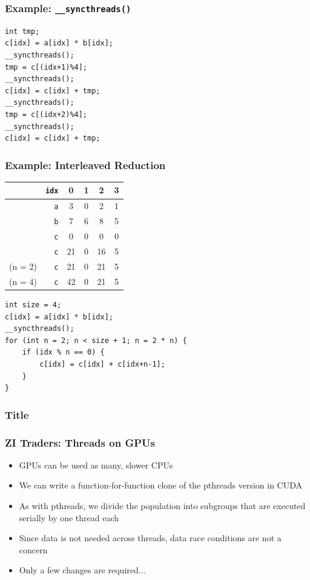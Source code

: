 \documentclass[handout]{beamer}
\begin{document}
\begin{frame}[fragile]
  \frametitle{Example: \texttt{\_\_syncthreads()}}
\begin{lstlisting}
int tmp;
c[idx] = a[idx] * b[idx];
__syncthreads();
tmp = c[(idx+1)%4];
__syncthreads();
c[idx] = c[idx] + tmp;
__syncthreads();
tmp = c[(idx+2)%4];
__syncthreads();
c[idx] = c[idx] + tmp;
\end{lstlisting}
\end{frame}

\begin{frame}[fragile]
  \frametitle{Example: Interleaved Reduction}
  \centering
  \begin{tabular}{cr|c|c|c|c|}
    &\texttt{idx} & 0 & 1 & 2 & 3 \\
    \hline
    &\texttt{a} & 3 & 0 & 2 & 1 \\
    &\texttt{b} & 7 & 6 & 8 & 5 \\
    & \texttt{c} & 0 & 0 & 0 & 0 \\
    & \texttt{c} & 21 & 0 & 16 & 5 \\
    (n = 2) & \texttt{c} & \color{red} 21 & 0 & \color{red} 21 & 5 \\
    (n = 4) & \texttt{c} & \color{red} 42 & 0 & 21  & 5 \\
  \end{tabular}
  \vspace{10pt}
\begin{lstlisting}
int size = 4;
c[idx] = a[idx] * b[idx];
__syncthreads();
for (int n = 2; n < size + 1; n = 2 * n) {
    if (idx % n == 0) {
        c[idx] = c[idx] + c[idx+n-1];
    }
}

\end{lstlisting}
\end{frame}

\begin{frame}
  \frametitle{Title}
\end{frame}

\begin{frame}
  \frametitle{ZI Traders: Threads on GPUs}
  \begin{itemize}
  \item GPUs can be used as many, slower CPUs
  \item We can write a function-for-function clone of the pthreads version in CUDA
  \item As with pthreads, we divide the population into
    subgroups that are executed serially by one thread each
  \item Since data is not needed across threads, data race conditions are not
    a concern
  \item Only a few changes are required...
  \end{itemize}
\end{frame}
\end{document}

